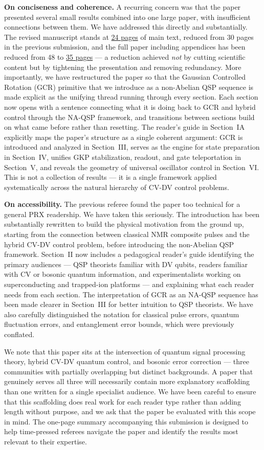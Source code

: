 \documentclass[11pt, letterpaper]{article}
\begin{document}
\textbf{On conciseness and coherence.} A recurring concern was that the paper presented several small results combined into one large paper, with insufficient connections between them. We have addressed this directly and substantially. The revised manuscript stands at \ul{24 pages} of main text, reduced from 30 pages in the previous submission, and the full paper including appendices has been reduced from 48 to \ul{35 pages} --- a reduction achieved \emph{not} by cutting scientific content but by tightening the presentation and removing redundancy. More importantly, we have restructured the paper so that the Gaussian Controlled Rotation (GCR) primitive that we introduce as a non-Abelian QSP sequence is made explicit as the unifying thread running through every section. Each section now opens with a sentence connecting what it is doing back to GCR and hybrid control through the NA-QSP framework, and transitions between sections build on what came before rather than resetting. The reader's guide in Section~IA explicitly maps the paper's structure as a single coherent argument: GCR is introduced and analyzed in Section~III, serves as the engine for state preparation in Section~IV, unifies GKP stabilization, readout, and gate teleportation in Section~V, and reveals the geometry of universal oscillator control in Section~VI. This is not a collection of results --- it is a single framework applied systematically across the natural hierarchy of CV-DV control problems.

\textbf{On accessibility.} The previous referee found the paper too technical for a general PRX readership. We have taken this seriously. The introduction has been substantially rewritten to build the physical motivation from the ground up, starting from the connection between classical NMR composite pulses and the hybrid CV-DV control problem, before introducing the non-Abelian QSP framework. Section~II now includes a pedagogical reader's guide identifying the primary audiences --- QSP theorists familiar with DV qubits, readers familiar with CV or bosonic quantum information, and experimentalists working on superconducting and trapped-ion platforms --- and explaining what each reader needs from each section. The interpretation of GCR as an NA-QSP sequence has been made clearer in Section~III for better intuition to QSP theorists. We have also carefully distinguished the notation for classical pulse errors, quantum fluctuation errors, and entanglement error bounds, which were previously conflated.

We note that this paper sits at the intersection of quantum signal processing theory, hybrid CV-DV quantum control, and bosonic error correction --- three communities with partially overlapping but distinct backgrounds. A paper that genuinely serves all three will necessarily contain more explanatory scaffolding than one written for a single specialist audience. We have been careful to ensure that this scaffolding does real work for each reader type rather than adding length without purpose, and we ask that the paper be evaluated with this scope in mind. The one-page summary accompanying this submission is designed to help time-pressed referees navigate the paper and identify the results most relevant to their expertise.
\end{document}
